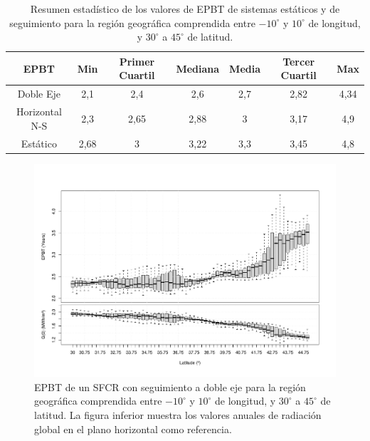 \begin{table}[p]

  \caption{\label{tab:ResultadosLCA}Resumen estadístico de los valores
    de EPBT de sistemas estáticos y de seguimiento para la región
    geográfica comprendida entre $-10^{\circ}$ y $10^{\circ}$ de
    longitud, y $30^{\circ}$ a $45^{\circ}$ de latitud.}


  \centering{}%
  \begin{tabular}{ccccccc}
    \toprule 
    EPBT & Min & Primer Cuartil & Mediana & Media & Tercer Cuartil & Max\tabularnewline
    \midrule 
    Doble Eje & 2,1 & 2,4 & 2,6 & 2,7 & 2,82 & 4,34\tabularnewline
    \midrule 
    Horizontal N-S & 2,3 & 2,65 & 2,88 & 3 & 3,17 & 4,9\tabularnewline
    \midrule 
    Estático & 2,68 & 3 & 3,22 & 3,3 & 3,45 & 4,8\tabularnewline
    \bottomrule
  \end{tabular}
\end{table}



\begin{figure}[p]
\begin{centering}
\includegraphics[height=0.38\textheight]{../figs/BoxPlotEPBTEuropa_SODA001}
\par\end{centering}

\caption{\label{EPBT2xBoxPlot}EPBT de un SFCR con seguimiento a doble
  eje para la región geográfica comprendida entre $-10^{\circ}$ y
  $10^{\circ}$ de longitud, y $30^{\circ}$ a $45^{\circ}$ de latitud.
  La figura inferior muestra los valores anuales de radiación global
  en el plano horizontal como referencia.}
\end{figure}


